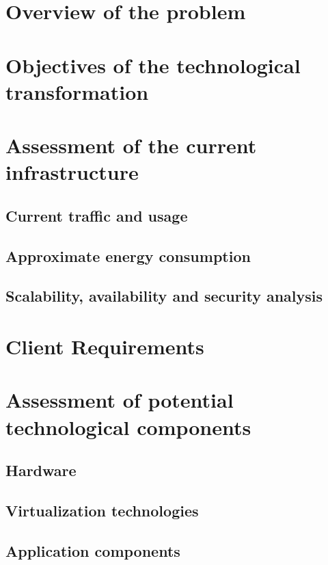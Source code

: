 \documentclass{llncs}
\begin{document}
\section{Overview of the problem}




\section{Objectives of the technological transformation}


\section{Assessment of the current infrastructure}

\subsection{Current traffic and usage}

\subsection{Approximate energy consumption}

\subsection{Scalability, availability and security analysis}




\section{Client Requirements}

\section{Assessment of potential technological components}

\subsection{Hardware}

\subsection{Virtualization technologies}


\subsection{Application components}
\end{document}
